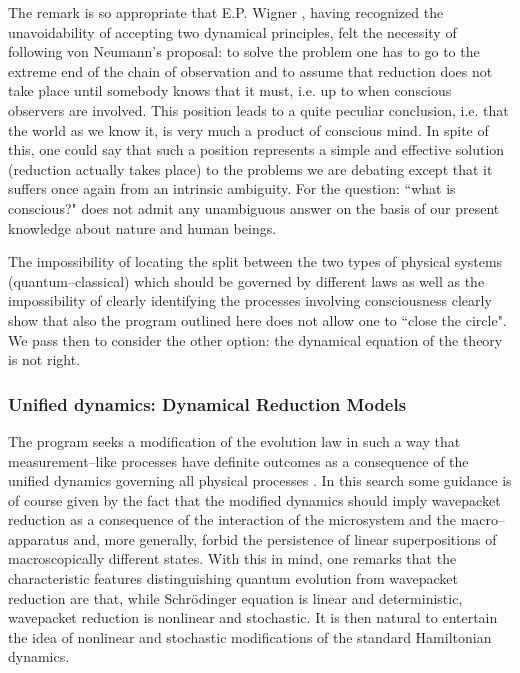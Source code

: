 \documentclass[12pt]{article}
\begin{document}
The remark is so appropriate that E.P. Wigner \cite{wig1}, having
recognized the unavoidability of accepting two dynamical
principles, felt the necessity of following von Neumann's
proposal: to solve the problem one has to go to the extreme end of
the chain of observation and to assume that reduction does not
take place until somebody knows that it must, i.e. up to when
conscious observers are involved. This position leads to a quite
peculiar conclusion, i.e. that the world as we know it, is very
much a product of conscious mind. In spite of this, one could say
that such a position represents a simple and effective solution
(reduction actually takes place) to the problems we are debating
except that it suffers once again from an intrinsic ambiguity. For
the question: ``what is conscious?" does not admit any unambiguous
answer on the basis of our present knowledge about nature and
human beings.

The impossibility of locating the split between the two types of
physical systems (quantum--classical) which should be governed by
different laws as well as the impossibility of clearly identifying
the processes involving consciousness clearly show that also the
program outlined here does not allow one to ``close the circle".
We pass then to consider the other option: the dynamical equation
of the theory is not right.


\subsubsection{Unified dynamics: Dynamical Reduction Models}
\label{sec372}

The program seeks a modification of the evolution law in such a
way that measurement--like processes have definite outcomes as a
consequence of the unified dynamics governing all physical
processes \cite{heid,grw,csl,rel,cc}. In this search some guidance is
of course given by the fact that the modified dynamics should
imply wavepacket reduction as a consequence of the interaction of
the microsystem and the macro--apparatus and, more generally,
forbid the persistence of linear superpositions of macroscopically
different states. With this in mind, one remarks that the
characteristic features distinguishing quantum evolution from
wavepacket reduction are that, while Schr\"odinger equation is
linear and deterministic, wavepacket reduction is nonlinear and
stochastic. It is then natural to entertain the idea of nonlinear
and stochastic modifications of the standard Hamiltonian dynamics.
\end{document}
